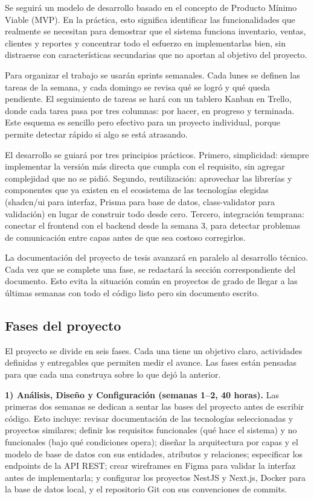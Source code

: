 \documentclass[spanish]{ieee_upb}
\begin{document}
Se seguirá un modelo de desarrollo basado en el concepto de Producto Mínimo Viable (MVP). En la práctica, esto significa identificar las funcionalidades que realmente se necesitan para demostrar que el sistema funciona inventario, ventas, clientes y reportes  y concentrar todo el esfuerzo en implementarlas bien, sin distraerse con características secundarias que no aportan al objetivo del proyecto.

Para organizar el trabajo se usarán sprints semanales. Cada lunes se definen las tareas de la semana, y cada domingo se revisa qué se logró y qué queda pendiente. El seguimiento de tareas se hará con un tablero Kanban en Trello, donde cada tarea pasa por tres columnas: por hacer, en progreso y terminada. Este esquema es sencillo pero efectivo para un proyecto individual, porque permite detectar rápido si algo se está atrasando.

El desarrollo se guiará por tres principios prácticos. Primero, simplicidad: siempre implementar la versión más directa que cumpla con el requisito, sin agregar complejidad que no se pidió. Segundo, reutilización: aprovechar las librerías y componentes que ya existen en el ecosistema de las tecnologías elegidas (shadcn/ui para interfaz, Prisma para base de datos, class-validator para validación) en lugar de construir todo desde cero. Tercero, integración temprana: conectar el frontend con el backend desde la semana 3, para detectar problemas de comunicación entre capas antes de que sea costoso corregirlos.

La documentación del proyecto de tesis avanzará en paralelo al desarrollo técnico. Cada vez que se complete una fase, se redactará la sección correspondiente del documento. Esto evita la situación común en proyectos de grado  de llegar a las últimas semanas con todo el código listo pero sin documento escrito.

\subsection{Fases del proyecto}

El proyecto se divide en seis fases. Cada una tiene un objetivo claro, actividades definidas y entregables que permiten medir el avance. Las fases están pensadas para que cada una construya sobre lo que dejó la anterior.

\textbf{1) Análisis, Diseño y Configuración (semanas 1--2, 40 horas).} Las primeras dos semanas se dedican a sentar las bases del proyecto antes de escribir código. Esto incluye: revisar documentación de las tecnologías seleccionadas y proyectos similares; definir los requisitos funcionales (qué hace el sistema) y no funcionales (bajo qué condiciones opera); diseñar la arquitectura por capas y el modelo de base de datos con sus entidades, atributos y relaciones; especificar los endpoints de la API REST; crear wireframes en Figma para validar la interfaz antes de implementarla; y configurar los proyectos NestJS y Next.js, Docker para la base de datos local, y el repositorio Git con sus convenciones de commits.
\end{document}
